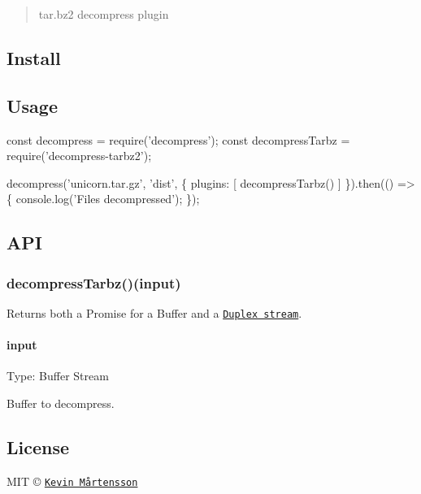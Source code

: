 \begin{quote}
tar.\+bz2 decompress plugin \end{quote}


\subsection*{Install}




\subsection*{Usage}


\begin{DoxyCode}
const decompress = require('decompress');
const decompressTarbz = require('decompress-tarbz2');

decompress('unicorn.tar.gz', 'dist', \{
  plugins: [
    decompressTarbz()
  ]
\}).then(() => \{
  console.log('Files decompressed');
\});
\end{DoxyCode}


\subsection*{A\+PI}

\subsubsection*{decompress\+Tarbz()(input)}

Returns both a {\ttfamily Promise} for a {\ttfamily Buffer} and a \href{https://nodejs.org/api/stream.html#stream_class_stream_duplex}{\tt {\ttfamily Duplex stream}}.

\paragraph*{input}

Type\+: {\ttfamily Buffer} {\ttfamily Stream}

Buffer to decompress.

\subsection*{License}

M\+IT © \href{https://github.com/kevva}{\tt Kevin Mårtensson} 